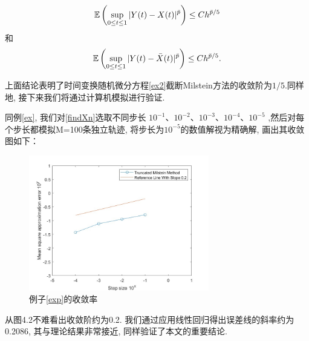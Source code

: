\begin{align*}
    \mathbb{E} \left( \sup_{0\leq t\leq 1}|Y(t)-X(t)|^{\bar{p}} \right) \leq Ch^{\bar{p}/5}
\end{align*}
和
\begin{align*}
    \mathbb{E} \left( \sup_{0\leq t\leq 1}|Y(t)-\bar{X}(t)|^{\bar{p}} \right) \leq Ch^{\bar{p}/5}.
\end{align*}
\par
上面结论表明了时间变换随机微分方程\eqref{ex2}截断Milstein方法的收敛阶为$1/5$.同样地, 接下来我们将通过计算机模拟进行验证.
\par 
同例\ref{ex}, 我们对\eqref{findXn}选取不同步长 $10^{-1}$、$10^{-2}$、$10^{-3}$、$10^{-4}$、$10^{-5}$ ,然后对每个步长都模拟M=100条独立轨迹, 将步长为$10^{-5}$的数值解视为精确解, 画出其收敛图如下：
\begin{figure}[H]
    \centering
    \includegraphics[width=0.70\textwidth]{22.jpg}
    \caption{例子\ref{exp}的收敛率}
\end{figure}
从图4.2不难看出收敛阶约为0.2. 我们通过应用线性回归得出误差线的斜率约为0.2086, 其与理论结果非常接近, 同样验证了本文的重要结论.

